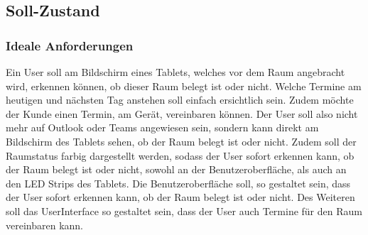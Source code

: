 \subsection{Soll-Zustand}\label{subsec:soll-zustand}
\subsubsection{Ideale Anforderungen}\label{subsubsec:ideale-anforderungen}
Ein User soll am Bildschirm eines Tablets, welches vor dem Raum angebracht wird, erkennen können, ob dieser Raum belegt ist oder nicht.
Welche Termine am heutigen und nächsten Tag anstehen soll einfach ersichtlich sein.
Zudem möchte der Kunde einen Termin, am Gerät, vereinbaren können.
Der User soll also nicht mehr auf Outlook oder Teams angewiesen sein, sondern kann direkt am Bildschirm des Tablets sehen, ob der Raum belegt ist oder nicht.
Zudem soll der Raumstatus farbig dargestellt werden, sodass der User sofort erkennen kann, ob der Raum belegt ist oder nicht, sowohl an der Benutzeroberfläche, als auch an den LED Strips des Tablets.
Die Benutzeroberfläche soll, so gestaltet sein, dass der User sofort erkennen kann, ob der Raum belegt ist oder nicht.
Des Weiteren soll das \gls{UserInterface} so gestaltet sein, dass der User auch Termine für den Raum vereinbaren kann.

